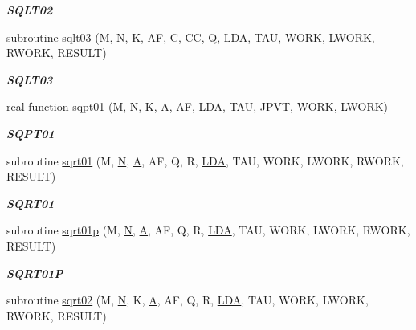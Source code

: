 \begin{DoxyCompactItemize}
\begin{DoxyCompactList}\small\item\em {\bfseries S\+Q\+L\+T02} \end{DoxyCompactList}\item 
subroutine \hyperlink{group__single__lin_ga69d359fbde7f9564bf278fcda07eb9d8}{sqlt03} (M, \hyperlink{polmisc_8c_a0240ac851181b84ac374872dc5434ee4}{N}, K, A\+F, C, C\+C, Q, \hyperlink{example__user_8c_ae946da542ce0db94dced19b2ecefd1aa}{L\+D\+A}, T\+A\+U, W\+O\+R\+K, L\+W\+O\+R\+K, R\+W\+O\+R\+K, R\+E\+S\+U\+L\+T)
\begin{DoxyCompactList}\small\item\em {\bfseries S\+Q\+L\+T03} \end{DoxyCompactList}\item 
real \hyperlink{afunc_8m_a7b5e596df91eadea6c537c0825e894a7}{function} \hyperlink{group__single__lin_ga4b7d2749a88c51a56c53f9310ed70d5f}{sqpt01} (M, \hyperlink{polmisc_8c_a0240ac851181b84ac374872dc5434ee4}{N}, K, \hyperlink{classA}{A}, A\+F, \hyperlink{example__user_8c_ae946da542ce0db94dced19b2ecefd1aa}{L\+D\+A}, T\+A\+U, J\+P\+V\+T, W\+O\+R\+K, L\+W\+O\+R\+K)
\begin{DoxyCompactList}\small\item\em {\bfseries S\+Q\+P\+T01} \end{DoxyCompactList}\item 
subroutine \hyperlink{group__single__lin_ga559c3c0d5c95be5713d263e3620b88c5}{sqrt01} (M, \hyperlink{polmisc_8c_a0240ac851181b84ac374872dc5434ee4}{N}, \hyperlink{classA}{A}, A\+F, Q, R, \hyperlink{example__user_8c_ae946da542ce0db94dced19b2ecefd1aa}{L\+D\+A}, T\+A\+U, W\+O\+R\+K, L\+W\+O\+R\+K, R\+W\+O\+R\+K, R\+E\+S\+U\+L\+T)
\begin{DoxyCompactList}\small\item\em {\bfseries S\+Q\+R\+T01} \end{DoxyCompactList}\item 
subroutine \hyperlink{group__single__lin_ga18dcf3ec34405c961f474cb419c74409}{sqrt01p} (M, \hyperlink{polmisc_8c_a0240ac851181b84ac374872dc5434ee4}{N}, \hyperlink{classA}{A}, A\+F, Q, R, \hyperlink{example__user_8c_ae946da542ce0db94dced19b2ecefd1aa}{L\+D\+A}, T\+A\+U, W\+O\+R\+K, L\+W\+O\+R\+K, R\+W\+O\+R\+K, R\+E\+S\+U\+L\+T)
\begin{DoxyCompactList}\small\item\em {\bfseries S\+Q\+R\+T01\+P} \end{DoxyCompactList}\item 
subroutine \hyperlink{group__single__lin_ga53355cdf673d1ec6b2ca6e3cbdf87fde}{sqrt02} (M, \hyperlink{polmisc_8c_a0240ac851181b84ac374872dc5434ee4}{N}, K, \hyperlink{classA}{A}, A\+F, Q, R, \hyperlink{example__user_8c_ae946da542ce0db94dced19b2ecefd1aa}{L\+D\+A}, T\+A\+U, W\+O\+R\+K, L\+W\+O\+R\+K, R\+W\+O\+R\+K, R\+E\+S\+U\+L\+T)

\end{DoxyCompactItemize}
